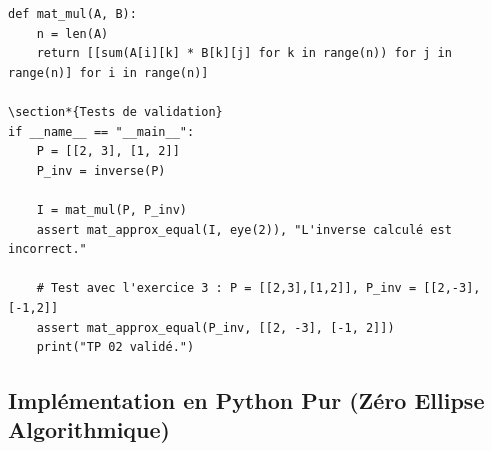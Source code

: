 \documentclass{report}
\begin{document}
\begin{verbatim}
def mat_mul(A, B):
    n = len(A)
    return [[sum(A[i][k] * B[k][j] for k in range(n)) for j in range(n)] for i in range(n)]

\section*{Tests de validation}
if __name__ == "__main__":
    P = [[2, 3], [1, 2]]
    P_inv = inverse(P)

    I = mat_mul(P, P_inv)
    assert mat_approx_equal(I, eye(2)), "L'inverse calculé est incorrect."

    # Test avec l'exercice 3 : P = [[2,3],[1,2]], P_inv = [[2,-3],[-1,2]]
    assert mat_approx_equal(P_inv, [[2, -3], [-1, 2]])
    print("TP 02 validé.")
\end{verbatim}






\subsection*{Implémentation en Python Pur (Zéro Ellipse Algorithmique)}
\end{document}
